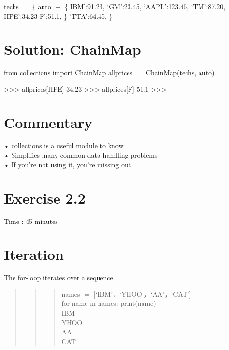 \documentclass[
  letterpaper,
  DIV=11,
  numbers=noendperiod]{scrreprt}
\newenvironment{Shaded}{\begin{snugshade}}{\end{snugshade}}
\newcommand{\NormalTok}[1]{\textcolor[rgb]{0.00,0.23,0.31}{#1}}
\begin{document}
techs \(=\) \{ auto \(\equiv\) \{ IBM':91.23, `GM':23.45, `AAPL':123.45,
`TM':87.20, HPE':34.23 F':51.1, \} `TTA':64.45, \}


\chapter{Solution: ChainMap}\label{solution-chainmap}

from collections import ChainMap allprices \(=\) ChainMap(techs, auto)

\begin{Shaded}
\begin{Highlighting}[]
\NormalTok{\textgreater{}\textgreater{}\textgreater{} allprices[\textquotesingle{}HPE\textquotesingle{}] 34.23   }
\NormalTok{\textgreater{}\textgreater{}\textgreater{} allprices[\textquotesingle{}F\textquotesingle{}] 51.1   }
\NormalTok{\textgreater{}\textgreater{}\textgreater{} }
\end{Highlighting}
\end{Shaded}


\chapter{Commentary}\label{commentary}

• collections is a useful module to know\\
• Simplifies many common data handling problems\\
• If you're not using it, you're missing out


\chapter{Exercise 2.2}\label{exercise-2.2}

Time : 45 minutes


\chapter{Iteration}\label{iteration}

The for-loop iterates over a sequence

\begin{quote}
\begin{quote}
\begin{quote}
names \(=\) {[}`IBM'，`YHOO'，`AA'，`CAT'{]}\\
for name in names: print(name)\\
IBM\\
YHOO\\
AA\\
CAT
\end{quote}
\end{quote}
\end{quote}
\end{document}
